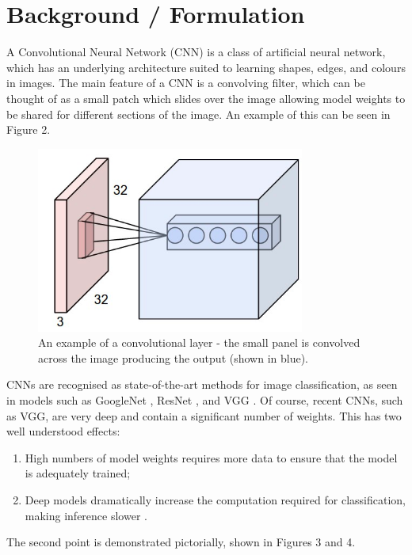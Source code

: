 \documentclass[10pt,journal,compsoc]{IEEEtran}
\begin{document}
		\section{Background / Formulation}
		A Convolutional Neural Network (CNN) is a class of artificial neural network, which has an underlying architecture suited to learning shapes, edges, and colours in images. The main feature of a CNN is a convolving filter, which can be thought of as a small patch which slides over the image allowing model weights to be shared for different sections of the image. An example of this can be seen in Figure 2.\\
		\begin{figure}[h]
			\centering
			\includegraphics[scale=0.35]{CNN}
			\caption{An example of a convolutional layer - the small panel is convolved across the image producing the output (shown in blue).}
		\end{figure}
		
		CNNs are recognised as state-of-the-art methods for image classification, as seen in models such as GoogleNet \cite{Szegedy:2014}, ResNet \cite{He:2015}, and VGG \cite{Simonyan:2015}. Of course, recent CNNs, such as VGG, are very deep and contain a significant number of weights. This has two well understood effects:
		\begin{enumerate}
			\item High numbers of model weights requires more data to ensure that the model is adequately trained;
			\item Deep models dramatically increase the computation required for classification, making inference slower \cite{Cansiani:2017}.
		\end{enumerate}
		
		The second point is demonstrated pictorially, shown in Figures 3 and 4.
		
\end{document}
